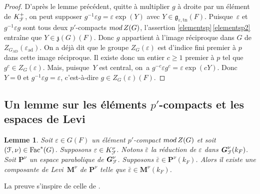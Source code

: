 \documentclass[11pt]{article}
\newcommand{\Subsection}{\subsection}
\numberwithin{equation}{section}\providecommand{\og}{«\,}\providecommand{\fg}{\,»}
\let\mathcal \EuScript
\let\epsilon\varepsilon
\newcommand{\rmod}{\textup{mod}\,}
\newcommand{\frg}{\mathfrak{g}}
\newcommand{\frz}{\mathfrak{z}}
\newcommand{\AD}{\mathrm{AD}}
\newcommand{\Fac}{\mathrm{Fac}}
\newcommand{\tn}{\mathrm{tn}}
\DeclareMathOperator{\ad}{ad}
\newcommand{\bG}{\boldsymbol{G}}
\newcommand{\bM}{\boldsymbol{M}}
\newcommand{\bP}{\boldsymbol{P}}
\newcommand{\cF}{\mathcal{F}}
\theoremstyle{plain}
\newtheorem*{lem*}{Lemme}
\theoremstyle{definition}
\begin{document}
\begin{proof}
D'après le lemme précédent, quitte à multiplier $g$ à droite par un élément de $K_{\cF}^+$, on peut supposer $g^{-1}\epsilon g=\epsilon \exp(Y)$ avec $Y\in \frg_{\epsilon,\tn}(F)$. Puisque~$\epsilon$ et $g^{-1}\epsilon g$ sont tous deux $p'$-compacts $\rmod Z(G)$, l'assertion \ref{elementsp}\,\eqref{elementsp2} entraîne que \hbox{$Y\in \frz(G)(F)$}. Donc $g$ appartient à l'image réciproque dans $G$ de $Z_{G_{\AD}}(\epsilon_{\ad})$. On a déjà dit que le groupe $Z_{G}(\epsilon)$ est d'indice fini premier à $p$ dans cette image réciproque. Il existe donc un entier $c\geq1$ premier à $p$ tel que $g^c\in Z_{G}(\epsilon)$. Mais, puisque~$Y$ est central, on~a $g^{-c}\epsilon g^c=\epsilon \exp(cY)$. Donc $Y=0$ et $g^{-1}\epsilon g=\epsilon$, c'est-à-dire $g\in Z_{G}(\epsilon)(F)$.
\end{proof}

\Subsection{Un lemme sur les éléments \texorpdfstring{$p'$}{p'}-compacts et les espaces de Levi}\label{p'unlemme}
\begin{lem*}
Soit $\epsilon\in G(F)$ un élément $p'$-compact $\rmod Z(G)$ et soit $(\cF,\nu)\in \Fac^*(G)$. Supposons $\epsilon\in K_{\cF}^{\nu}$. Notons $\bar{\epsilon}$ la réduction de $\epsilon$ dans $\bG_{\cF}^{\nu}(k_{F})$. Soit $\bP^{\nu}$ un espace parabolique de $\bG_{\cF}^{\nu}$. Supposons $\bar{\epsilon}\in \bP^{\nu}(k_{F})$. Alors il existe une composante de Levi~$\bM^{\nu}$ de $\bP^{\nu}$ telle que $\bar{\epsilon}\in \bM^{\nu}(k_{F})$.
\end{lem*}

La preuve s'inspire de celle de \cite[Lem.\,9]{P}.
\end{document}
